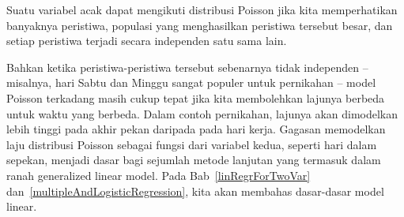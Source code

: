 Suatu variabel acak dapat mengikuti distribusi Poisson jika kita memperhatikan banyaknya peristiwa, populasi yang menghasilkan peristiwa tersebut besar, dan setiap peristiwa terjadi secara independen satu sama lain.

Bahkan ketika peristiwa-peristiwa tersebut sebenarnya tidak independen --
misalnya, hari Sabtu dan Minggu sangat
populer untuk pernikahan --
model Poisson terkadang masih cukup tepat
jika kita membolehkan lajunya berbeda untuk waktu yang
berbeda.
Dalam contoh pernikahan, lajunya akan dimodelkan
lebih tinggi pada akhir pekan daripada pada hari kerja.
Gagasan memodelkan laju distribusi Poisson
sebagai fungsi dari variabel kedua, seperti hari dalam sepekan, menjadi
dasar bagi sejumlah metode lanjutan
yang termasuk dalam ranah 
    {generalized linear model}.
Pada Bab~\ref{linRegrForTwoVar}
dan~\ref{multipleAndLogisticRegression},
kita akan membahas dasar-dasar model linear.



{}
